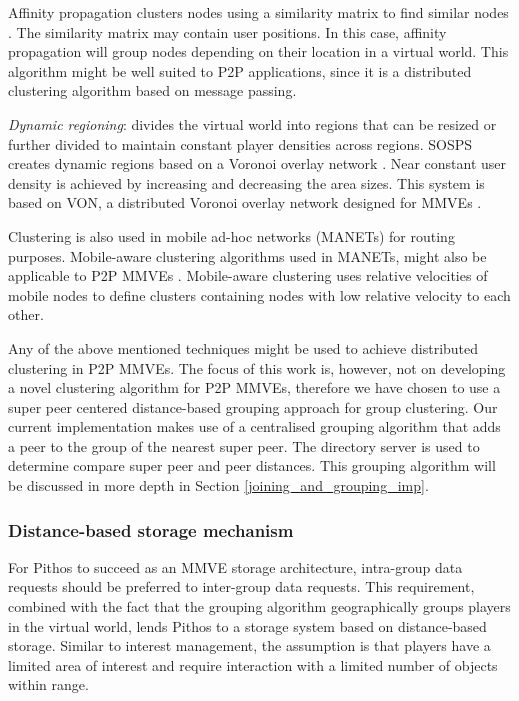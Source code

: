 Affinity propagation clusters nodes using a similarity matrix to find similar nodes \cite{affinity_propagation}. The similarity matrix may contain user positions. In this case, affinity propagation will group nodes depending on their location in a virtual world. This algorithm might be well suited to P2P applications, since it is a distributed clustering algorithm based on message passing.

\emph{Dynamic regioning}: divides the virtual world into regions that can be resized or further divided to maintain constant player densities across regions. SOSPS \cite{self_organising_sps_post} creates dynamic regions based on a Voronoi overlay network \cite{voronoi_diagrams_survey}. Near constant user density is achieved by increasing and decreasing the area sizes. This system is based on VON, a distributed Voronoi overlay network designed for MMVEs \cite{VON_VAST}.

Clustering is also used in mobile ad-hoc networks (MANETs) for routing purposes. Mobile-aware clustering algorithms used in MANETs, might also be applicable to P2P MMVEs \cite{clustering_survey}. Mobile-aware clustering uses relative velocities of mobile nodes to define clusters containing nodes with low relative velocity to each other.

Any of the above mentioned techniques might be used to achieve distributed clustering in P2P MMVEs. The focus of this work is, however, not on developing a novel clustering algorithm for P2P MMVEs, therefore we have chosen to use a super peer centered distance-based grouping approach for group clustering. Our current implementation makes use of a centralised grouping algorithm that adds a peer to the group of the nearest super peer. The directory server is used to determine compare super peer and peer distances. This grouping algorithm will be discussed in more depth in Section \ref{joining_and_grouping_imp}.

\subsubsection{Distance-based storage mechanism}
\label{distance_based_design}

For Pithos to succeed as an MMVE storage architecture, intra-group data requests should be preferred to inter-group data requests. This requirement, combined with the fact that the grouping algorithm geographically groups players in the virtual world, lends Pithos to a storage system based on distance-based storage. Similar to interest management, the assumption is that players have a limited area of interest and require interaction with a limited number of objects within range.

